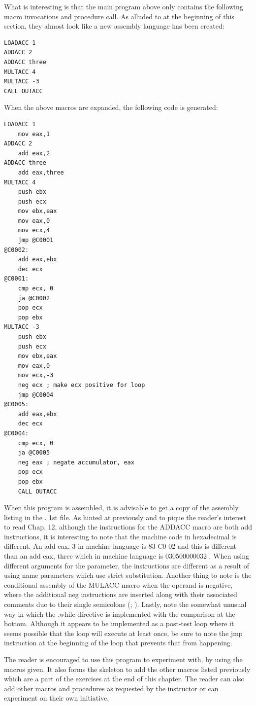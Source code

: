 \documentclass[10pt]{book}
\begin{document}
What is interesting is that the main program above only contains the following macro invocations and procedure call. As alluded to at the beginning of this section, they almost look like a new assembly language has been created:

\begin{verbatim}
LOADACC 1
ADDACC 2
ADDACC three
MULTACC 4
MULTACC -3
CALL OUTACC
\end{verbatim}

When the above macros are expanded, the following code is generated:

\begin{verbatim}
LOADACC 1
    mov eax,1
ADDACC 2
    add eax,2
ADDACC three
    add eax,three
MULTACC 4
    push ebx
    push ecx
    mov ebx,eax
    mov eax,0
    mov ecx,4
    jmp @C0001
@C0002:
    add eax,ebx
    dec ecx
@C0001:
    cmp ecx, 0
    ja @C0002
    pop ecx
    pop ebx
MULTACC -3
    push ebx
    push ecx
    mov ebx,eax
    mov eax,0
    mov ecx,-3
    neg ecx ; make ecx positive for loop
    jmp @C0004
@C0005:
    add eax,ebx
    dec ecx
@C0004:
    cmp ecx, 0
    ja @C0005
    neg eax ; negate accumulator, eax
    pop ecx
    pop ebx
    CALL OUTACC
\end{verbatim}

When this program is assembled, it is advisable to get a copy of the assembly listing in the . 1st file. As hinted at previously and to pique the reader's interest to read Chap. 12, although the instructions for the ADDACC macro are both add instructions, it is interesting to note that the machine code in hexadecimal is different. An add eax, 3 in machine language is 83 C0 02 and this is different than an add eax, three which in machine language is 030500000032 . When using different arguments for the parameter, the instructions are different as a result of using name parameters which use strict substitution. Another thing to note is the conditional assembly of the MULACC macro when the operand is negative, where the additional neg instructions are inserted along with their associated comments due to their single semicolons (; ). Lastly, note the somewhat unusual way in which the .while directive is implemented with the comparison at the bottom. Although it appears to be implemented as a post-test loop where it seems possible that the loop will execute at least once, be sure to note the jmp instruction at the beginning of the loop that prevents that from happening.

The reader is encouraged to use this program to experiment with, by using the macros given. It also forms the skeleton to add the other macros listed previously which are a part of the exercises at the end of this chapter. The reader can also add other macros and procedures as requested by the instructor or can experiment on their own initiative.
\end{document}
